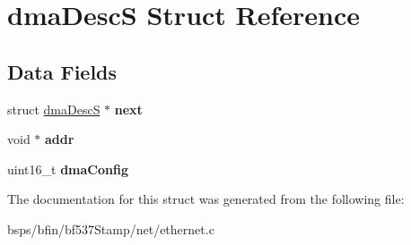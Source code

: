 \hypertarget{structdmaDescS}{}\section{dma\+DescS Struct Reference}
\label{structdmaDescS}
\subsection*{Data Fields}
\begin{DoxyCompactItemize}
\item 
\mbox{\label{structdmaDescS_a8a53c3081e3aabdd8ce7084e906f84f3}} 
struct \mbox{\hyperlink{structdmaDescS}{dma\+DescS}} $\ast$ {\bfseries next}
\item 
\mbox{\label{structdmaDescS_a773ab820697e314cd88198056b706e91}} 
void $\ast$ {\bfseries addr}
\item 
\mbox{\label{structdmaDescS_aec383d64d2c395d47104eff9af0d8f31}} 
uint16\+\_\+t {\bfseries dma\+Config}
\end{DoxyCompactItemize}


The documentation for this struct was generated from the following file\+:\begin{DoxyCompactItemize}
\item 
bsps/bfin/bf537\+Stamp/net/ethernet.\+c\end{DoxyCompactItemize}
